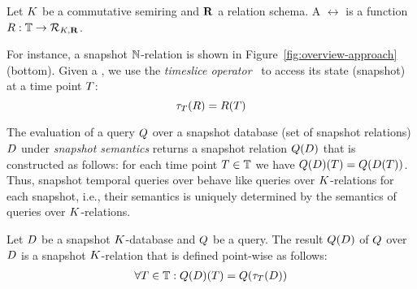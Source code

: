 \begin{defi}\label{def:snapshot-k-rel}
  Let $K$ be a commutative semiring and ${\bf R}$ a relation
  schema. A \SKrel{} $\rel$ is a function
  $R : \mathbb{T} \to \mathcal{R}_{K,{\bf R}}$.
\end{defi}

For instance, a snapshot ${\mathbb{N}}$-relation is shown in
Figure~\ref{fig:overview-approach} (bottom). Given a \SKrel{}, we use the
\textit{timeslice operator}~\cite{DBLP:reference/db/JensenS09w} to access its
state (snapshot) at a time point $T$: %
%
$$\tau_{T}(R) = R(T)$$




The evaluation of a query $Q$ over a snapshot database (set of snapshot relations)
  $D$ under \emph{snapshot semantics} returns a snapshot
relation $Q(D)$ that is constructed as follows: for each time
point $T \in \mathbb{T}$ we have
$Q(D)(T) = Q(D(T))$.
%
Thus, snapshot temporal queries over \SKrels{}
behave like queries over $K$-relations for each
snapshot, i.e., their semantics is uniquely determined by the semantics of queries over $K$-relations.

\begin{defi} %
  \label{def:snapshot-k-rel-queries}
  Let $D$ be a snapshot $K$-database and $Q$ be a query. %
  The result $Q(D)$ of $Q$ over $D$ is a snapshot $K$-relation that is defined point-wise as follows:
  \begin{align*}
    \forall T \in \mathbb{T}: Q(D)(T) = Q(\tau_{T}(D))
  \end{align*}
\end{defi}

